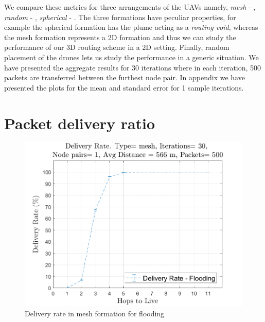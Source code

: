 We compare these metrics for three arrangements of the UAVs namely, \emph{mesh} - , \emph{random} - , \emph{spherical} - . The three formations have peculiar properties, for example the spherical formation has the plume acting as a \emph{routing void}, whereas the mesh formation represents a 2D formation and thus we can study the performance of our 3D routing scheme in a 2D setting. Finally, random placement of the drones lets us study the performance in a generic situation. We have presented the aggregate results for 30 iterations where in each iteration, 500 packets are transferred between the furthest node pair. In appendix we have presented the plots for the mean and standard error for 1 sample iterations.

\section{Packet delivery ratio}
\label{pdr}

\begin{figure}[hbtp]
\centering
\includegraphics[width=\simResultFigSize \textwidth]{ncsuthesis-0.6/Chapter-5/figs/fl_DR_mesh.png}
\caption{Delivery rate in mesh formation for flooding}
\label{fig:fl_DR_mesh}
\end{figure}


